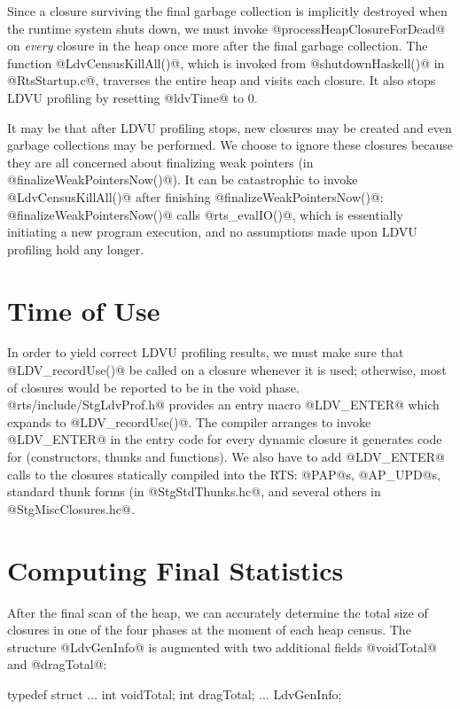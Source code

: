\documentclass{article}
\begin{document}
Since a closure surviving the final garbage collection is implicitly destroyed
when the runtime system shuts down, we must invoke @processHeapClosureForDead@
on \emph{every} closure in the heap once more after the final garbage collection.
The function @LdvCensusKillAll()@, which is invoked from @shutdownHaskell()@
in @RtsStartup.c@, traverses the entire heap and visits each closure.
It also stops LDVU profiling by resetting @ldvTime@ to $0$. 

It may be that after LDVU profiling stops, new closures may be created
and even garbage collections may be performed.
We choose to ignore these closures because they are all concerned about
finalizing weak pointers (in @finalizeWeakPointersNow()@).
It can be catastrophic to invoke @LdvCensusKillAll()@ after finishing
@finalizeWeakPointersNow()@: @finalizeWeakPointersNow()@ calls
@rts_evalIO()@, which is essentially initiating a new program execution,
and no assumptions made upon LDVU profiling hold any longer. 

\section{Time of Use}

In order to yield correct LDVU profiling results, we must make sure
that @LDV_recordUse()@ be called on a closure whenever it is used;
otherwise, most of closures would be reported to be in the void phase.
@rts/include/StgLdvProf.h@ provides an entry macro @LDV_ENTER@ which
expands to @LDV_recordUse()@.  The compiler arranges to invoke
@LDV_ENTER@ in the entry code for every dynamic closure it generates
code for (constructors, thunks and functions).  We also have to add
@LDV_ENTER@ calls to the closures statically compiled into the RTS:
@PAP@s, @AP_UPD@s, standard thunk forms (in @StgStdThunks.hc@, and
several others in @StgMiscClosures.hc@.

\section{Computing Final Statistics}

After the final scan of the heap, we can accurately determine the total
size of closures in one of the four phases at the moment of each heap census.
The structure @LdvGenInfo@ is augmented with two additional fields 
@voidTotal@ and @dragTotal@:

\begin{code}
typedef struct {
  ...
  int voidTotal;
  int dragTotal;
  ...
} LdvGenInfo;
\end{code} 
\end{document}
